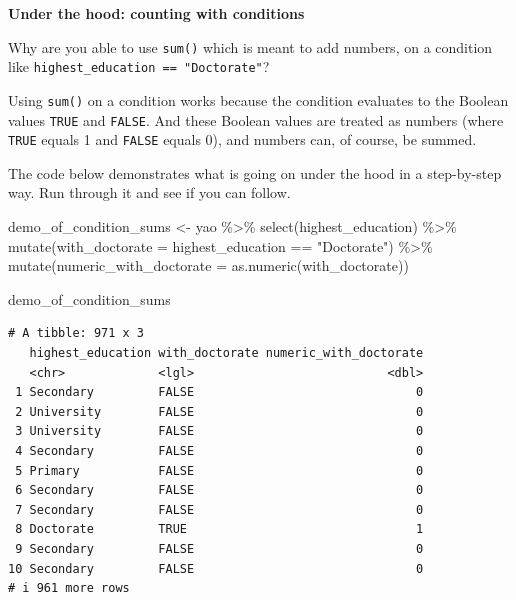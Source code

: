 \documentclass[
  letterpaper,
  DIV=11,
  numbers=noendperiod]{scrreprt}
\newenvironment{Shaded}{\begin{snugshade}}{\end{snugshade}}
\newcommand{\AttributeTok}[1]{\textcolor[rgb]{0.40,0.45,0.13}{#1}}
\newcommand{\FunctionTok}[1]{\textcolor[rgb]{0.28,0.35,0.67}{#1}}
\newcommand{\NormalTok}[1]{\textcolor[rgb]{0.00,0.23,0.31}{#1}}
\newcommand{\OtherTok}[1]{\textcolor[rgb]{0.00,0.23,0.31}{#1}}
\newcommand{\SpecialCharTok}[1]{\textcolor[rgb]{0.37,0.37,0.37}{#1}}
\newcommand{\StringTok}[1]{\textcolor[rgb]{0.13,0.47,0.30}{#1}}
\begin{document}
\begin{tcolorbox}[enhanced jigsaw, colframe=quarto-callout-note-color-frame, rightrule=.15mm, opacityback=0, breakable, coltitle=black, colbacktitle=quarto-callout-note-color!10!white, bottomrule=.15mm, leftrule=.75mm, toprule=.15mm, arc=.35mm, bottomtitle=1mm, colback=white, left=2mm, opacitybacktitle=0.6, titlerule=0mm, title=\textcolor{quarto-callout-note-color}{\faInfo}\hspace{0.5em}{Challenge}, toptitle=1mm]

\textbf{Under the hood: counting with conditions}

Why are you able to use \texttt{sum()} which is meant to add numbers, on
a condition like \texttt{highest\_education\ ==\ "Doctorate"}?

Using \texttt{sum()} on a condition works because the condition
evaluates to the Boolean values \texttt{TRUE} and \texttt{FALSE}. And
these Boolean values are treated as numbers (where \texttt{TRUE} equals
1 and \texttt{FALSE} equals 0), and numbers can, of course, be summed.

The code below demonstrates what is going on under the hood in a
step-by-step way. Run through it and see if you can follow.

\begin{Shaded}
\begin{Highlighting}[]
\NormalTok{demo\_of\_condition\_sums }\OtherTok{\textless{}{-}}\NormalTok{ yao }\SpecialCharTok{\%\textgreater{}\%} 
  \FunctionTok{select}\NormalTok{(highest\_education) }\SpecialCharTok{\%\textgreater{}\%} 
  \FunctionTok{mutate}\NormalTok{(}\AttributeTok{with\_doctorate =}\NormalTok{ highest\_education }\SpecialCharTok{==} \StringTok{"Doctorate"}\NormalTok{) }\SpecialCharTok{\%\textgreater{}\%} 
  \FunctionTok{mutate}\NormalTok{(}\AttributeTok{numeric\_with\_doctorate =} \FunctionTok{as.numeric}\NormalTok{(with\_doctorate))}

\NormalTok{demo\_of\_condition\_sums}
\end{Highlighting}
\end{Shaded}

\begin{verbatim}
# A tibble: 971 x 3
   highest_education with_doctorate numeric_with_doctorate
   <chr>             <lgl>                           <dbl>
 1 Secondary         FALSE                               0
 2 University        FALSE                               0
 3 University        FALSE                               0
 4 Secondary         FALSE                               0
 5 Primary           FALSE                               0
 6 Secondary         FALSE                               0
 7 Secondary         FALSE                               0
 8 Doctorate         TRUE                                1
 9 Secondary         FALSE                               0
10 Secondary         FALSE                               0
# i 961 more rows
\end{verbatim}


\end{tcolorbox}
\end{document}
